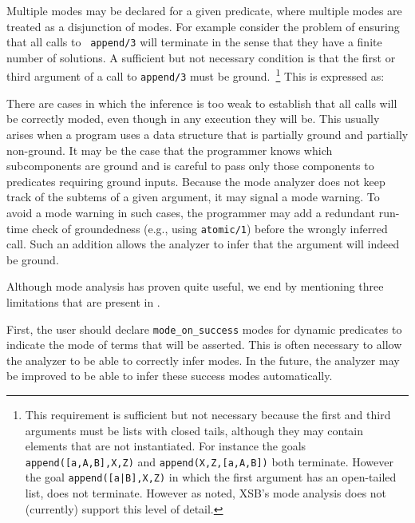 \begin{description}
     Multiple modes may be declared for a given predicate, where
     multiple modes are treated as a disjunction of modes.  For
     example consider the problem of ensuring that all calls to {\tt
       append/3} will terminate in the sense that they have a finite
     number of solutions.  A sufficient but not necessary condition is
     that the first or third argument of a call to {\tt append/3} must
     be ground.~\footnote{This requirement is sufficient but not
       necessary because the first and third arguments must be lists
       with closed tails, although they may contain elements that are
       not instantiated.  For instance the goals {\tt
         append([a,A,B],X,Z)} and {\tt append(X,Z,[a,A,B])} both
       terminate.  However the goal {\tt append([a|B],X,Z)} in which
       the first argument has an open-tailed list, does not terminate.
       However as noted, XSB's mode analysis does not (currently)
       support this level of detail.}  This is expressed as:



        There are cases in which the inference is too weak to
        establish that all calls will be correctly moded, even though
        in any execution they will be.  This usually arises when a
        program uses a data structure that is partially ground and
        partially non-ground.  It may be the case that the programmer
        knows which subcomponents are ground and is careful to pass
        only those components to predicates requiring ground inputs.
        Because the mode analyzer does not keep track of the subtems
        of a given argument, it may signal a mode warning.  To avoid a
        mode warning in such cases, the programmer may add a redundant
        run-time check of groundedness (e.g., using {\tt atomic/1})
        before the wrongly inferred call.  Such an addition allows the
        analyzer to infer that the argument will indeed be ground.

        Although mode analysis has proven quite useful, we end by
        mentioning three limitations that are present in \version{}.

        First, the user should declare {\tt mode\_on\_success} modes
        for dynamic predicates to indicate the mode of terms that will
        be asserted.  This is often necessary to allow the analyzer to
        be able to correctly infer modes.  In the future, the analyzer
        may be improved to be able to infer these success modes
        automatically.


\end{description}
